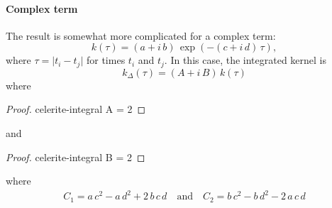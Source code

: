 \documentclass[modern]{aastex62}
\begin{document}
\paragraph{Complex term}

The result is somewhat more complicated for a complex term:
\begin{equation}
k(\tau) = (a + i\,b)\,\exp\left(-(c+i\,d)\,\tau\right),
\end{equation}
where $\tau = \vert t_i-t_j \vert$ for times $t_i$ and $t_j$.
In this case, the integrated kernel is
\begin{equation}
k_\Delta(\tau) = (A + i\,B)\,k(\tau)
\end{equation}
where
\begin{proof}{celerite-integral}
  A = 2
\end{proof}
and
\begin{proof}{celerite-integral}
  B = 2
\end{proof}
where
\begin{align}
C_1 = a\,c^2 - a\,d^2 + 2\,b\,c\,d
\quad\mathrm{and}\quad
C_2 = b\,c^2 - b\,d^2 - 2\,a\,c\,d
\end{align}
\end{document}

